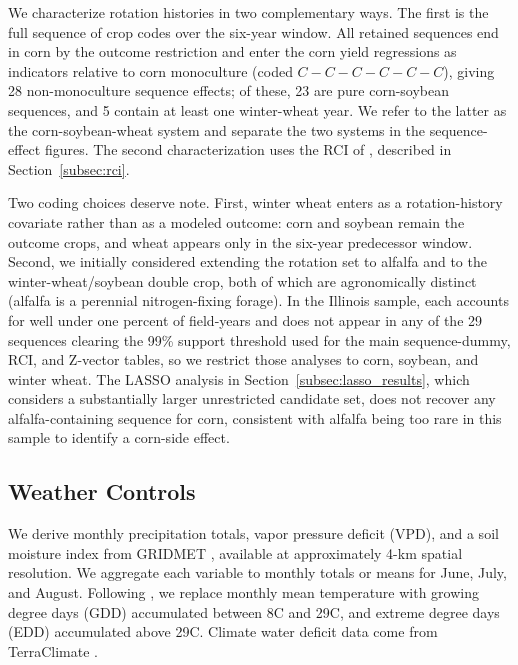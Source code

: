 \documentclass[12pt,letterpaper]{article}
\theoremstyle{remark}
\theoremstyle{remark}
\theoremstyle{plain}
\theoremstyle{definition}
\begin{document}
We characterize rotation histories in two complementary ways. The first is the full sequence of crop codes over the six-year window. All retained sequences end in corn by the outcome restriction and enter the corn yield regressions as indicators relative to corn monoculture (coded $C-C-C-C-C-C$), giving 28 non-monoculture sequence effects; of these, 23 are pure corn-soybean sequences, and 5 contain at least one winter-wheat year. We refer to the latter as the corn-soybean-wheat system and separate the two systems in the sequence-effect figures. The second characterization uses the RCI of \citet{socolar2021}, described in Section~\ref{subsec:rci}.

Two coding choices deserve note. First, winter wheat enters as a rotation-history covariate rather than as a modeled outcome: corn and soybean remain the outcome crops, and wheat appears only in the six-year predecessor window. Second, we initially considered extending the rotation set to alfalfa and to the winter-wheat/soybean double crop, both of which are agronomically distinct (alfalfa is a perennial nitrogen-fixing forage). In the Illinois sample, each accounts for well under one percent of field-years and does not appear in any of the 29 sequences clearing the 99\% support threshold used for the main sequence-dummy, RCI, and Z-vector tables, so we restrict those analyses to corn, soybean, and winter wheat. The LASSO analysis in Section~\ref{subsec:lasso_results}, which considers a substantially larger unrestricted candidate set, does not recover any alfalfa-containing sequence for corn, consistent with alfalfa being too rare in this sample to identify a corn-side effect.

\subsection{\label{subsec:w_controls}Weather Controls}
We derive monthly precipitation totals, vapor pressure deficit (VPD), and a soil moisture index from GRIDMET \citep{Abatzoglou2013}, available at approximately 4-km spatial resolution. We aggregate each variable to monthly totals or means for June, July, and August. Following \citet{SchlenkerRoberts2009}, we replace monthly mean temperature with growing degree days (GDD) accumulated between 8\textdegree C and 29\textdegree C, and extreme degree days (EDD) accumulated above 29\textdegree C. Climate water deficit data come from TerraClimate \citep{Abatzoglou2018}.
\end{document}
